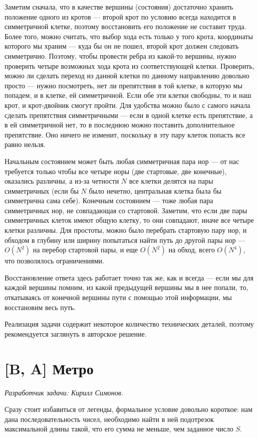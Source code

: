 \documentclass[12pt]{article}
\theoremstyle{definition}
\begin{document}
Заметим сначала, что в качестве вершины (состояния) достаточно хранить положение одного из кротов --- второй крот по условию всегда находится в симметричной клетке, поэтому восстановить
его положение не составит труда. Более того, можно считать, что выбор хода есть только у
того крота, координаты которого мы храним --- куда бы он не пошел, второй крот должен следовать симметрично. Поэтому,
чтобы провести ребра из какой-то вершины, нужно проверить четыре возможных хода крота
из соответствующей клетки. Проверить, можно ли сделать переход из данной клетки по
данному направлению довольно просто --- нужно посмотреть, нет ли препятствия в той клетке,
в которую мы попадем, и в клетке, ей симметричной. Если обе эти клетки свободны, то и наш
крот, и крот-двойник смогут пройти. Для удобства можно было с самого начала сделать
препятствия симметричными --- если в одной клетке есть препятствие, а в ей
симметричной нет, то в последнюю можно поставить дополнительное препятствие. Оно
ничего не изменит, поскольку в эту пару клеток попасть все равно нельзя.

Начальным состоянием может быть любая симметричная пара нор --- от нас требуется
только чтобы все четыре норы (две стартовые, две конечные), оказались различны, а из-за
четности $N$ все клетки делятся на пары симметричных (если бы $N$ было нечетно,
центральная клетка была бы симметрична сама себе). Конечным состоянием --- тоже любая пара симметричных нор, не совпадающая со стартовой. Заметим, что если две пары симметричных клеток
имеют общую клетку, то они совпадают, иначе все четыре клетки различны. Для простоты,
можно было перебрать стартовую пару нор, и обходом в глубину или ширину попытаться
найти путь до другой пары нор --- $O(N^2)$ на перебор стартовой пары, и еще
$O(N^2)$ на обход, всего $O(N^4)$, что позволялось ограничениями.

Восстановление ответа здесь работает точно так же, как и всегда --- если мы для каждой вершины помним, из какой предыдущей вершины мы в нее попали, то, откатываясь от конечной
вершины пути с помощью этой информации, мы восстановим весь путь.

Реализация задачи содержит некоторое количество технических деталей, поэтому рекомендуется
заглянуть в авторское решение.

\section{[B, A] Метро}
\textit{Разработчик задачи: Кирилл Симонов.}

Сразу стоит избавиться от легенды, формальное условие довольно короткое:
нам дана последовательность чисел, необходимо найти
в ней подотрезок максимальной длины такой, что его сумма не меньше, чем заданное число $S$.
\end{document}
